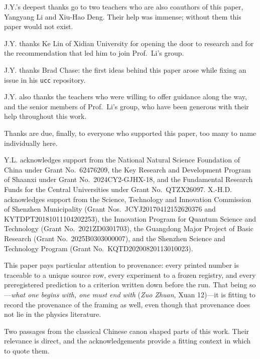 \documentclass[a4paper,twocolumn,10pt,unpublished]{quantumarticle}
\begin{document}
\begin{acknowledgements}
J.Y.'s deepest thanks go to two teachers who are also coauthors of this
paper, Yangyang Li and Xiu-Hao Deng.  Their help was immense; without them
this paper would not exist.

J.Y. thanks Ke Lin of Xidian University for opening the door to research
and for the recommendation that led him to join Prof.~Li's group.

J.Y. thanks Brad Chase: the first ideas behind this paper arose while
fixing an issue in his \texttt{ucc} repository.

J.Y. also thanks the teachers who were willing to offer guidance along the
way, and the senior members of Prof.~Li's group, who have been generous
with their help throughout this work.

Thanks are due, finally, to everyone who supported this paper, too many to
name individually here.

Y.L. acknowledges support from the National Natural Science Foundation of
China under Grant No.~62476209, the Key Research and Development Program of
Shaanxi under Grant No.~2024CY2-GJHX-18, and the Fundamental Research Funds
for the Central Universities under Grant No.~QTZX26097.  X.-H.D.
acknowledges support from the Science, Technology and Innovation Commission of Shenzhen
Municipality (Grant Nos.~JCYJ20170412152620376 and KYTDPT20181011104202253),
the Innovation Program for Quantum Science and Technology (Grant
No.~2021ZD0301703), the Guangdong Major Project of Basic Research (Grant
No.~2025B0303000007), and the Shenzhen Science and Technology Program
(Grant No.~KQTD20200820113010023).

This paper pays particular attention to provenance: every printed number is
traceable to a unique source row, every experiment to a frozen registry, and
every preregistered prediction to a criterion written down before the run.  That being
so---\emph{what one begins with, one must end with} (\emph{Zuo Zhuan},
Xuan 12)---it is fitting to record the provenance of the framing as well,
even though that provenance does not lie in the physics literature.

\ifdefined\QuantumSubmissionVersion
\else
Two passages from the classical Chinese canon shaped parts of this work.
Their relevance is direct, and the acknowledgements provide a fitting
context in which to quote them.


\end{acknowledgements}
\end{document}
